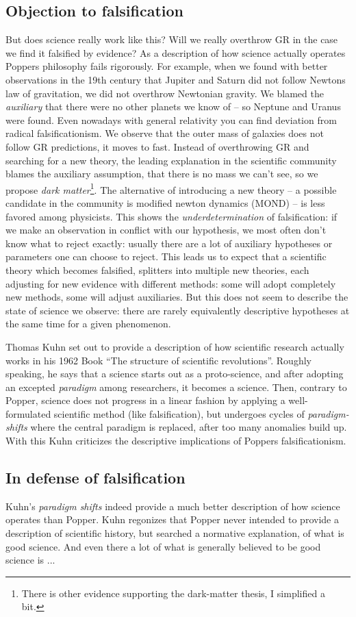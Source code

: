 \subsection{Objection to falsification}
But does science really work like this? Will we really overthrow GR
in the case we find it falsified by evidence?
As a description of how science actually operates Poppers
philosophy fails rigorously.
For example, when we found with better observations in the 19th century that Jupiter and Saturn
did not follow Newtons law of gravitation, we did not overthrow Newtonian gravity.
We blamed the \emph{auxiliary} that there were no other planets we know of --
so Neptune and Uranus were found.
Even nowadays with general relativity you can find deviation from
radical falsificationism.
We observe that the outer mass of galaxies does not
follow GR predictions, it moves to fast.
Instead of overthrowing GR and searching for a new theory,
the leading explanation in the scientific community
blames the auxiliary assumption, that there is no mass we can't see, so
we propose
\emph{dark matter}\footnote{There is other evidence supporting the dark-matter thesis, I simplified a bit.}.
The alternative of introducing a new theory
-- a possible candidate in the community is modified newton dynamics (MOND) --
is less favored among physicists.
This shows the \emph{underdetermination} of falsification:
if we make an observation in conflict with our hypothesis, we most often don't
know what to reject exactly: usually there are a lot of auxiliary hypotheses
or parameters one can choose to reject.
This leads us to expect that a scientific theory which becomes falsified,
splitters into multiple new theories, each adjusting for new evidence with
different methods: some will adopt completely new methods, some will
adjust auxiliaries.
But this does not seem to describe the state of science we observe:
there are rarely equivalently descriptive hypotheses at the same time
for a given phenomenon.

Thomas Kuhn set out to provide a description of how scientific
research actually works in his 1962 Book \enquote{The structure of scientific revolutions}.
Roughly speaking, he says that a science starts out as a proto-science, and
after adopting an excepted \emph{paradigm} among researchers,
it becomes a science.
Then, contrary to Popper, science does not progress in a linear
fashion by applying a well-formulated scientific method (like falsification),
but undergoes cycles of \emph{paradigm-shifts} where the central paradigm
is replaced, after too many anomalies build up.
With this Kuhn criticizes the descriptive implications
of Poppers falsificationism.

\subsection{In defense of falsification}
Kuhn's \emph{paradigm shifts} indeed provide a much better description of
how science operates than Popper. Kuhn regonizes that
Popper never intended to provide a description of scientific history,
but searched a normative explanation, of what is good science.
And even there a lot of what is generally believed to be good science is ...